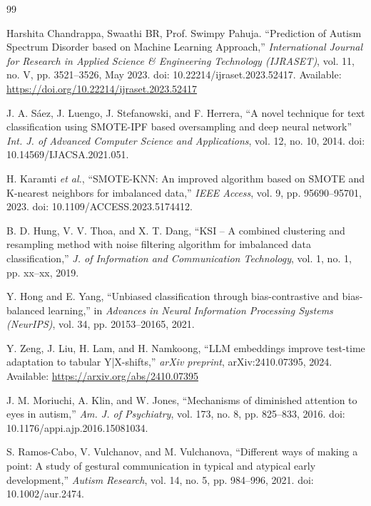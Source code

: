 \documentclass[conference]{IEEEtran}
\begin{document}
\begin{thebibliography}{99}

 Harshita Chandrappa, Swaathi BR, Prof. Swimpy Pahuja. ``Prediction of Autism Spectrum Disorder based on Machine Learning Approach,'' \textit{International Journal for Research in Applied Science \& Engineering Technology (IJRASET)}, vol. 11, no. V, pp. 3521–3526, May 2023. doi: 10.22214/ijraset.2023.52417.
Available: \url{https://doi.org/10.22214/ijraset.2023.52417}

 J. A. Sáez, J. Luengo, J. Stefanowski, and F. Herrera, ``A novel technique for text classification using SMOTE-IPF based oversampling and deep neural network'' \textit{Int. J. of Advanced Computer Science and Applications}, vol. 12, no. 10, 2014. doi: 10.14569/IJACSA.2021.051.

 H. Karamti \textit{et al.}, ``SMOTE-KNN: An improved algorithm based on SMOTE and K-nearest neighbors for imbalanced data,'' \textit{IEEE Access}, vol. 9, pp. 95690--95701, 2023. doi: 10.1109/ACCESS.2023.5174412.

 B. D. Hung, V. V. Thoa, and X. T. Dang, ``KSI – A combined clustering and resampling method with noise filtering algorithm for imbalanced data classification,'' \textit{J. of Information and Communication Technology}, vol. 1, no. 1, pp. xx--xx, 2019.

 Y. Hong and E. Yang, ``Unbiased classification through bias-contrastive and bias-balanced learning,'' in \textit{Advances in Neural Information Processing Systems (NeurIPS)}, vol. 34, pp. 20153--20165, 2021.


 Y. Zeng, J. Liu, H. Lam, and H. Namkoong, ``LLM embeddings improve test-time adaptation to tabular Y|X-shifts,'' \textit{arXiv preprint}, arXiv:2410.07395, 2024. Available: \url{https://arxiv.org/abs/2410.07395}

 J. M. Moriuchi, A. Klin, and W. Jones, ``Mechanisms of diminished attention to eyes in autism,'' \textit{Am. J. of Psychiatry}, vol. 173, no. 8, pp. 825--833, 2016. doi: 10.1176/appi.ajp.2016.15081034.

 S. Ramos-Cabo, V. Vulchanov, and M. Vulchanova, ``Different ways of making a point: A study of gestural communication in typical and atypical early development,'' \textit{Autism Research}, vol. 14, no. 5, pp. 984--996, 2021. doi: 10.1002/aur.2474.


\end{thebibliography}
\end{document}
